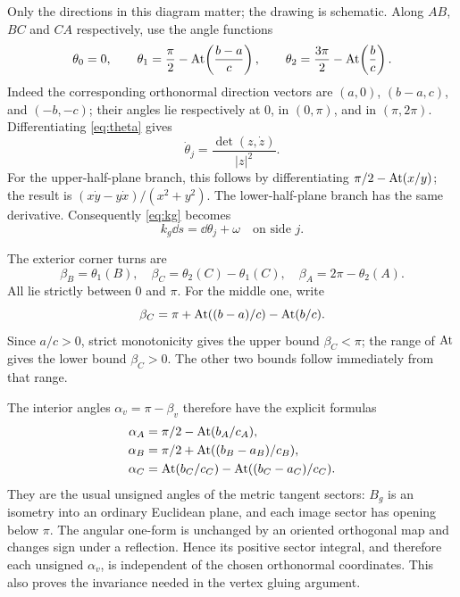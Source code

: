 Only the directions in this diagram matter; the drawing is schematic. Along $AB$, $BC$ and $CA$ respectively, use the angle functions
\begin{equation}\label{eq:theta}
\theta_0=0,\qquad
\theta_1=\frac\pi2-\operatorname{At}\!\left(\frac{b-a}{c}\right),\qquad
\theta_2=\frac{3\pi}2-\operatorname{At}\!\left(\frac bc\right).
\end{equation}
Indeed the corresponding orthonormal direction vectors are
$(a,0)$, $(b-a,c)$, and $(-b,-c)$; their angles lie respectively at $0$, in $(0,\pi)$, and in $(\pi,2\pi)$. Differentiating \eqref{eq:theta} gives
\begin{equation}\label{eq:thetaDerivative}
\dot\theta_j=\frac{\det(z,\dot z)}{|z|^2}.
\end{equation}
For the upper-half-plane branch, this follows by differentiating
$\pi/2-\operatorname{At}(x/y)$; the result is $(x\dot y-y\dot x)/(x^2+y^2)$. The lower-half-plane branch has the same derivative. Consequently \eqref{eq:kg} becomes
\begin{equation}\label{eq:kgAngle}
k_g\dd s=\dd\theta_j+\omega
\quad\text{on side }j.
\end{equation}

The exterior corner turns are
\begin{equation}\label{eq:betas}
\beta_B=\theta_1(B),\quad
\beta_C=\theta_2(C)-\theta_1(C),\quad
\beta_A=2\pi-\theta_2(A).
\end{equation}
All lie strictly between $0$ and $\pi$. For the middle one, write
\[
\beta_C=\pi+\operatorname{At}((b-a)/c)-\operatorname{At}(b/c).
\]
Since $a/c>0$, strict monotonicity gives the upper bound $\beta_C<\pi$; the range of $\operatorname{At}$ gives the lower bound $\beta_C>0$. The other two bounds follow immediately from that range.

The interior angles $\alpha_v=\pi-\beta_v$ therefore have the explicit formulas
\begin{equation}\label{eq:alphas}
\begin{aligned}
\alpha_A&=\pi/2-\operatorname{At}(b_A/c_A),\\
\alpha_B&=\pi/2+\operatorname{At}((b_B-a_B)/c_B),\\
\alpha_C&=\operatorname{At}(b_C/c_C)-\operatorname{At}((b_C-a_C)/c_C).
\end{aligned}
\end{equation}
They are the usual unsigned angles of the metric tangent sectors: $B_g$ is an isometry into an ordinary Euclidean plane, and each image sector has opening below $\pi$. The angular one-form is unchanged by an oriented orthogonal map and changes sign under a reflection. Hence its positive sector integral, and therefore each unsigned $\alpha_v$, is independent of the chosen orthonormal coordinates. This also proves the invariance needed in the vertex gluing argument.

